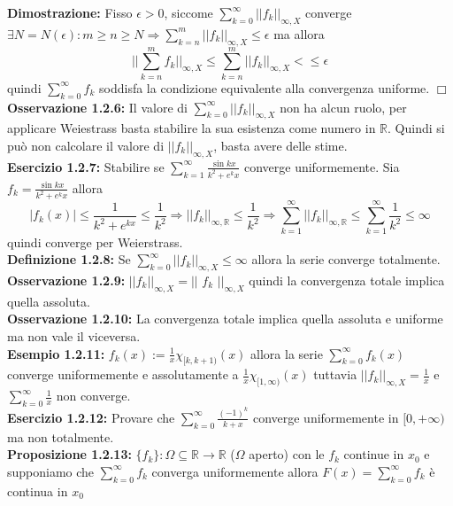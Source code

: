 \documentclass[a4paper,11pt,titlepage]{book}
\begin{document}
\textbf{Dimostrazione:} Fisso $\epsilon >0$, siccome $\sum_{k=0}^{\infty}||f_k||_{\infty,X}$ converge $\exists N=N(\epsilon): m\geq n\geq N \Rightarrow \sum_{k=n}^{m} ||f_{k}||_{\infty,X}\leq\epsilon$ ma allora $$||\sum_{k=n}^{m}f_{k}||_{\infty,X}\leq\sum_{k=n}^{m} ||f_{k}||_{\infty,X}<\leq\epsilon$$ quindi $\sum_{k=0}^\infty f_{k}$ soddisfa la condizione equivalente alla convergenza uniforme. $\Box$\\

\textbf{Osservazione 1.2.6:} Il valore di $\sum_{k=0}^{\infty}||f_k||_{\infty,X}$ non ha alcun ruolo, per applicare Weiestrass basta stabilire la sua esistenza come numero in $\mathbb{R}$. Quindi si può non calcolare il valore di $||f_k||_{\infty,X}$, basta avere delle  stime.\\

\textbf{Esercizio 1.2.7:} Stabilire se $\sum_{k=1}^{\infty}\frac{\sin{kx}}{k^2+e^kx}$ converge uniformemente.
Sia $f_k=\frac{\sin{kx}}{k^2+e^kx}$ allora $$|f_k(x)|\leq\frac{1}{k^2+e^{kx}}\leq\frac{1}{k^2}\Rightarrow ||f_k||_{\infty,\mathbb{R}}\leq\frac{1}{k^2}\Rightarrow\sum_{k=1}^{\infty}||f_k||_{\infty,\mathbb{R}}\leq\sum_{k=1}^{\infty}\frac{1}{k^2}\leq\infty$$ quindi converge per Weierstrass.\\

\textbf{Definizione 1.2.8:} Se $\sum_{k=0}^{\infty}||f_k||_{\infty,X}\leq\infty$ allora la serie converge totalmente.\\

\textbf{Osservazione 1.2.9:} $||f_k||_{\infty,X}=||$ $f_k$ $||_{\infty,X}$ quindi la convergenza totale implica quella assoluta.\\

\textbf{Osservazione 1.2.10:} La convergenza totale implica quella assoluta e uniforme ma non vale il viceversa.\\

\textbf{Esempio 1.2.11:} $f_k(x):=\frac{1}{x}\chi_{[k,k+1)}(x)$ allora la serie $\sum_{k=0}^{\infty} f_k(x)$ converge uniformemente e assolutamente a $\frac{1}{x}\chi_{[1,\infty)}(x)$ tuttavia $||f_k||_{\infty,X}=\frac{1}{x}$ e $\sum_{k=0}^{\infty}\frac{1}{x}$ non converge.\\

\textbf{Esercizio 1.2.12:} Provare che $\sum_{k=0}^{\infty}\frac{(-1)^k}{k+x}$ converge uniformemente in $[0,+\infty)$ ma non totalmente. \\

\textbf{Proposizione 1.2.13:}  $\{f_{k}\}:\Omega\subseteq\mathbb{R}\to\mathbb{R}$ ($\Omega$ aperto) con le $f_k$ continue in $x_0$ e supponiamo che $\sum_{k=0}^\infty f_{k}$ converga uniformemente allora $F(x)=\sum_{k=0}^\infty f_{k}$ è continua in $x_0$\\
\end{document}
